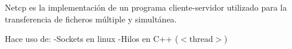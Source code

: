 Netcp es la implementación de un programa cliente-\/servidor utilizado para la transferencia de ficheros múltiple y simultánea.

Hace uso de\+: -\/\+Sockets en linux -\/\+Hilos en C++ ($<$thread$>$) 